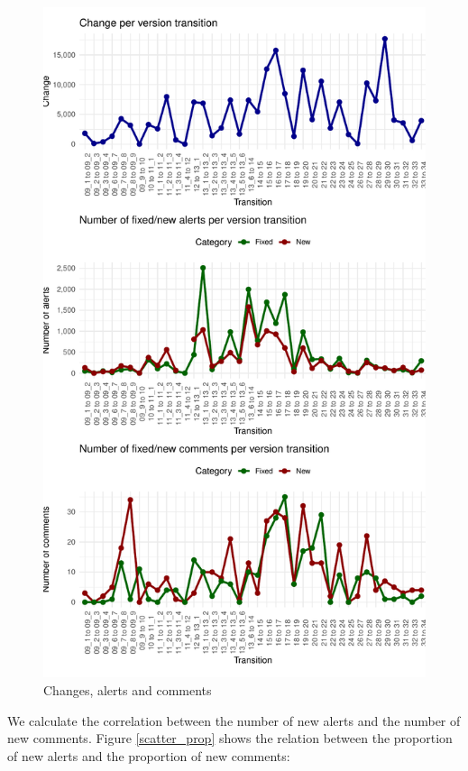 \documentclass[
]{article}
\begin{document}
\small
\begin{figure}
\centering
\includegraphics{report_files/figure-latex/unnamed-chunk-19-1.pdf}
\caption{\label{timeseries}Changes, alerts and comments}
\end{figure}

\normalsize

We calculate the correlation between the number of new alerts and the number of new comments.
Figure \ref{scatter_prop} shows the relation between the proportion of new alerts and the 
proportion of new comments:
\end{document}
